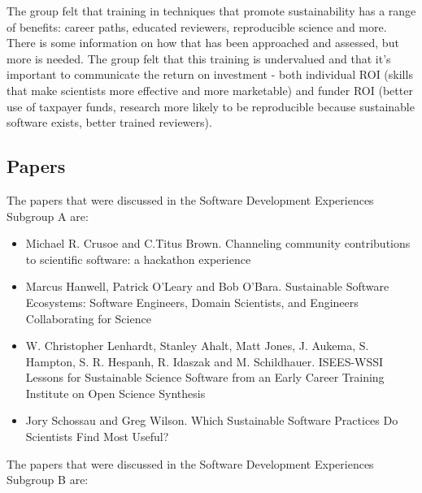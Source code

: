 \documentclass[11pt, oneside]{amsart}
\begin{document}
The group felt that training in techniques that promote sustainability has
a range of benefits: career paths, educated reviewers, reproducible
science and more. There is some information on how that has been
approached and assessed, but more is needed. The group felt that this
training is undervalued and that it's important to communicate the return
on investment - both individual ROI (skills that make scientists more
effective and more marketable) and funder ROI (better use of taxpayer
funds, research more likely to be reproducible because sustainable
software exists, better trained reviewers).



\subsection{Papers}
The papers that were discussed in the Software Development Experiences Subgroup A are:

\begin{itemize}
\item Michael R. Crusoe and C.Titus Brown. Channeling community contributions to
scientific software: a hackathon experience~\cite{wssspe2_crusoe}

\item Marcus Hanwell, Patrick O'Leary and Bob O'Bara. Sustainable Software
Ecosystems: Software Engineers, Domain Scientists, and Engineers Collaborating
for Science~\cite{wssspe2_hanwell}

\item W. Christopher Lenhardt, Stanley Ahalt, Matt Jones, J. Aukema, S. Hampton,
S. R. Hespanh, R. Idaszak and M. Schildhauer. {ISEES-WSSI} Lessons for
Sustainable Science Software from an Early Career Training Institute on Open
Science Synthesis~\cite{wssspe2_lenhardt}

\item Jory Schossau and Greg Wilson. Which Sustainable Software Practices Do
Scientists Find Most Useful?~\cite{wssspe2_schossau}

\end{itemize}

The papers that were discussed in the Software Development Experiences Subgroup B are:
\end{document}
